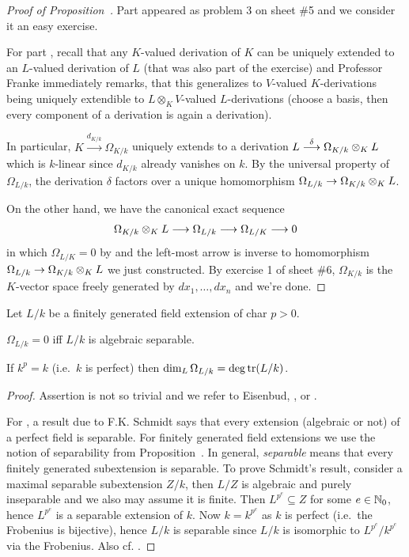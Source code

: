 \documentclass[a4paper,parskip=half,numbers=enddot, DIV=12]{scrreprt}
\begin{document}
\begin{proof}[Proof of Proposition~]
	Part  appeared as problem 3 on sheet \#5 and we consider it an easy exercise.
	
	For part , recall that any $K$-valued derivation of $K$ can be uniquely extended to an $L$-valued derivation of $L$ (that was also part of the exercise) and Professor Franke immediately remarks, that this generalizes to $V$-valued $K$-derivations being uniquely extendible to $L\otimes_KV$-valued $L$-derivations (choose a basis, then every component of a derivation is again a derivation). 
	
	In particular, $K\xrightarrow{d_{K/k}}\Omega_{K/k}$ uniquely extends to a derivation $L\morphism[\delta]\Omega_{K/k}\otimes_KL$ which is $k$-linear since $d_{K/k}$ already vanishes on $k$. By the universal property of $\Omega_{L/k}$, the derivation $\delta$ factors over a unique homomorphism $\Omega_{L/k}\morphism\Omega_{K/k}\otimes_K L$.
	
	On the other hand, we have the canonical exact sequence
	\begin{align*}
		\Omega_{K/k}\otimes_KL\morphism\Omega_{L/k}\morphism\Omega_{L/K}\morphism 0
	\end{align*}
	in which $\Omega_{L/K}=0$ by  and the left-most arrow is inverse to homomorphism $\Omega_{L/k}\morphism\Omega_{K/k}\otimes_K L$ we just constructed. By exercise 1 of sheet \#6, $\Omega_{K/k}$ is the $K$-vector space freely generated by $dx_1,\ldots,dx_n$ and we're done.
\end{proof}
\begin{prop}
    Let $L/k$ be a finitely generated field extension of char $p>0$. 
    \begin{alphanumerate}
      \item 
        $\Omega_{L/k} =0$ iff $L/k$ is algebraic separable.
      \item 
        If $k^p =k$ (i.e.\ $k$ is perfect) then $\dim_L\Omega_{L/k} = \deg\operatorname{tr}(L/k)$.
    \end{alphanumerate}
\end{prop}
\begin{proof}
	Assertion  is not so trivial and we refer to Eisenbud, \cite[Corollary~16.17]{eisenbudCommAlg}, or \cite[Proposition~5.6]{kunzKahler}.
	
	For , a result due to F.K. Schmidt says that every extension (algebraic or not) of a perfect field is separable. For finitely generated field extensions we use the notion of separability from Proposition~. In general, \emph{separable} means that every finitely generated subextension is separable. To prove Schmidt's result, consider a maximal separable subextension $Z/k$, then $L/Z$ is algebraic and purely inseparable and we also may assume it is finite. Then $L^{p^e}\subseteq Z$ for some $e\in\mathbb{N}_0$, hence $L^{p^e}$ is a separable extension of $k$. Now $k=k^{p^e}$ as $k$ is perfect (i.e.\ the Frobenius is bijective), hence $L/k$ is separable since $L/k$ is isomorphic to $L^{p^e}/k^{p^e}$ via the Frobenius. Also cf. \cite[Proposition~5.18]{kunzKahler}.
\end{proof}
\end{document}

